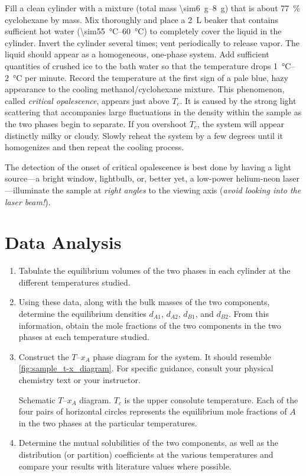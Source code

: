 \begin{enumerate}
	Fill a clean cylinder with a mixture (total mass \qtyrange{\sim6}{8}{\g}) that is about \qty{77}{\percent} cyclohexane by mass. 
	Mix thoroughly and place a \qty{2}{\L} beaker that contains sufficient hot water (\qtyrange{\sim55}{60}{\degreeCelsius}) to completely cover the liquid in the cylinder. 
	Invert the cylinder several times; vent periodically to release vapor. 
	The liquid should appear as a homogeneous, one-phase system. 
	Add sufficient quantities of crushed ice to the bath water so that the temperature drops \qtyrange{1}{2}{\degreeCelsius} per minute. 
	Record the temperature at the first sign of a pale blue, hazy appearance to the cooling methanol/cyclohexane mixture. 
	This phenomenon, called \emph{critical opalescence}, appears just above \(T_c\). 
	It is caused by the strong light scattering that accompanies large fluctuations in the density within the sample as the two phases begin to separate. 
	If you overshoot \(T_c\), the system will appear distinctly milky or cloudy. 
	Slowly reheat the system by a few degrees until it homogenizes and then repeat the cooling process. 
	
	The detection of the onset of critical opalescence is best done by having a light source---a bright window, lightbulb, or, better yet, a low-power helium-neon laser---illuminate the sample at \emph{right angles} to the viewing axis (\emph{avoid looking into the laser beam!}). 
\end{enumerate}

\section{Data Analysis}
\label{sec:data_analysis}

\begin{enumerate}
	\item Tabulate the equilibrium volumes of the two phases in each cylinder at the different temperatures studied. 
	\item Using these data, along with the bulk masses of the two components, determine the equilibrium densities \(d_{A1}\), \(d_{A2}\), \(d_{B1}\), and \(d_{B2}\). 
	From this information, obtain the mole fractions of the two components in the two phases at each temperature studied. 
	\item Construct the \(T\)--\(x_A\) phase diagram for the system. 
	It should resemble \cref{fig:sample_t-x_diagram}. 
	For specific guidance, consult your physical chemistry text or your instructor.
	\begin{marginfigure}
		
		\caption{Schematic \(T\)--\(x_A\) diagram. \(T_c\) is the upper consolute temperature. 
		Each of the four pairs of horizontal circles represents the equilibrium mole fractions of \(A\) in the two phases at the particular temperatures.}
		\label{fig:sample_t-x_diagram}
	\end{marginfigure}
	\item Determine the mutual solubilities of the two components, as well as the distribution (or partition) coefficients at the various temperatures and compare your results with literature values where possible.
\end{enumerate}

